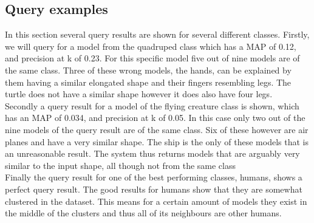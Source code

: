 \documentclass{bigdata}
\begin{document}
\subsection{Query examples}
In this section several query results are shown for several different classes. Firstly, we will query for a model from the quadruped class which has a MAP of 0.12, and precision at k of 0.23. For this specific model five out of nine models are of the same class. Three of these wrong models, the hands, can be explained by them having a similar elongated shape and their fingers resembling legs. The turtle does not have a similar shape however it does also have four legs.  \\
Secondly a query result for a model of the flying creature class is shown, which has an MAP of 0.034, and precision at k of 0.05. In this case only two out of the nine models of the query result are of the same class. Six of these however are air planes and have a very similar shape. The ship is the only of these models that is an unreasonable result. The system thus returns models that are arguably very similar to the input shape, all though not from the same class \\
Finally the query result for one of the best performing classes, humans, shows a perfect query result. The good results for humans show that they are somewhat clustered in the dataset. This means for a certain amount of models they exist in the middle of the clusters and thus all of its neighbours are other humans. \\
\end{document}
